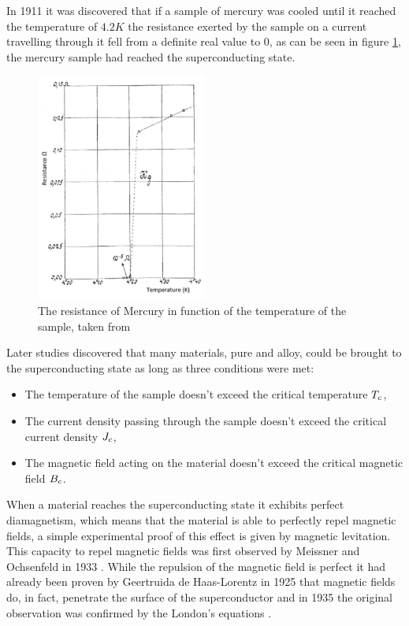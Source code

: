 In 1911 \cite{invention-superconductivity} it was discovered that if a sample of mercury was cooled
until it reached the temperature of $4.2K$ the resistance exerted by the sample on a current travelling
through it fell from a definite real value to $0$, as can be
seen in figure \ref{img:mercury-resistance}, the mercury sample had reached the superconducting state.
\begin{figure}
	\centering
	\includegraphics[width=0.5\textwidth]{./img/mercury-resistance.png}
	\caption{The resistance of Mercury in function of the temperature of the sample, taken from
		\cite{tsukerman2020compendium}}
	\label{img:mercury-resistance}
\end{figure}

Later studies discovered that many materials, pure and alloy, could be brought to the
superconducting state as long as three conditions were met:
\begin{itemize}
	\item The temperature of the sample doesn't exceed the critical temperature $T_c$,
	\item The current density passing through the sample doesn't exceed the critical current
	      density $J_c$,
	\item The magnetic field acting on the material doesn't exceed the critical magnetic field $B_c$.
\end{itemize}

When a material reaches the superconducting state it exhibits perfect diamagnetism, which means that
the material is able to perfectly repel magnetic fields, a simple experimental proof of this effect
is given by magnetic levitation. This capacity to repel magnetic fields was first observed by
Meissner and Ochsenfeld in 1933 \cite{meissner1933}. While the repulsion of the magnetic field is
perfect it had already been proven by Geertruida de Haas-Lorentz in 1925 \cite{fokker1925physica}
that magnetic fields do, in fact, penetrate the surface of the superconductor and in 1935 the
original observation was confirmed by the London's equations \cite{london1935}.

